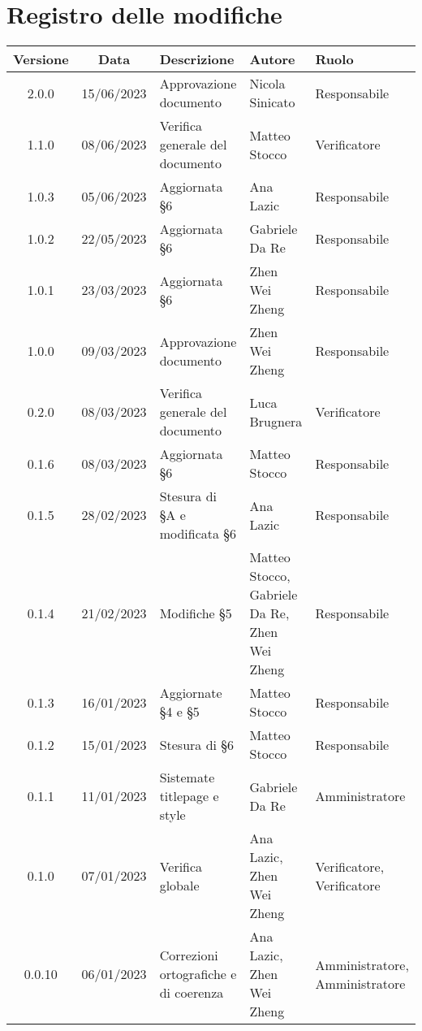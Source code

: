 \section*{Registro delle modifiche}
\begin{center}
	\renewcommand\tabularxcolumn[1]{>{\Centering}m{#1}}
	\setlength\extrarowheight{5pt}
	\begin{tabularx}{\textwidth}{| c | c | X | X | X |} 
		\hline
		\rowcolor{white}
		\textbf{Versione} & \textbf{Data} & \textbf{Descrizione} & 	\textbf{Autore} & \textbf{Ruolo}\\
		\hline
	 	2.0.0 & 15/06/2023 & Approvazione documento & Nicola Sinicato & Responsabile \\
		\hline
	 	1.1.0 & 08/06/2023 & Verifica generale del documento & Matteo Stocco & Verificatore \\
		\hline
	 	1.0.3 & 05/06/2023 & Aggiornata §6 & Ana Lazic & Responsabile \\
		\hline
	 	1.0.2 & 22/05/2023 & Aggiornata §6 & Gabriele Da Re & Responsabile \\
		\hline
	 	1.0.1 & 23/03/2023 & Aggiornata §6 & Zhen Wei Zheng & Responsabile \\
		\hline
	 	1.0.0 & 09/03/2023 & Approvazione documento & Zhen Wei Zheng & Responsabile \\
		\hline
		0.2.0 & 08/03/2023 & Verifica generale del documento & Luca Brugnera & Verificatore \\
		\hline
		0.1.6 & 08/03/2023 & Aggiornata §6 & Matteo Stocco & Responsabile \\
        	\hline
		0.1.5 & 28/02/2023 & Stesura di §A e modificata §6 & Ana Lazic & Responsabile \\
        	\hline
		0.1.4 & 21/02/2023 & Modifiche §5 & Matteo Stocco, Gabriele Da Re, Zhen Wei Zheng & Responsabile \\
		\hline
		0.1.3 & 16/01/2023 & Aggiornate §4 e §5 & Matteo Stocco & Responsabile \\
		\hline
		0.1.2 & 15/01/2023 & Stesura di §6 & Matteo Stocco & Responsabile \\
    		\hline
		0.1.1 & 11/01/2023 & Sistemate titlepage e style & Gabriele Da Re & Amministratore \\
	  	\hline
		0.1.0 & 07/01/2023 & Verifica globale & Ana Lazic, Zhen Wei Zheng & Verificatore, Verificatore \\
	  	\hline
		0.0.10 & 06/01/2023 & Correzioni ortografiche e di coerenza & Ana Lazic, Zhen Wei Zheng & Amministratore, Amministratore \\

\end{tabularx}
\end{center}
